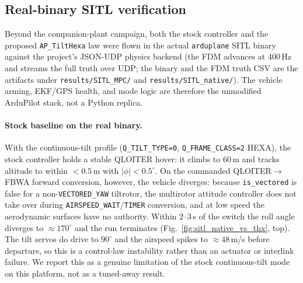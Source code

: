 \documentclass[preprint,3p,11pt]{elsarticle}
\begin{document}
\subsection{Real-binary SITL verification}\label{sec:realsitl}
Beyond the companion-plant campaign, both the stock controller and the
proposed \texttt{AP\_TiltHexa} law were flown in the actual
\texttt{arduplane} SITL binary against the project's JSON-UDP physics backend
(the FDM advances at 400\,Hz and streams the full truth over UDP; the binary
and the FDM truth CSV are the artifacts under \texttt{results/SITL\_MPC/} and
\texttt{results/SITL\_native/}). The vehicle arming, EKF/GPS health, and mode
logic are therefore the unmodified ArduPilot stack, not a Python replica.

\paragraph{Stock baseline on the real binary.}
With the continuous-tilt profile (\texttt{Q\_TILT\_TYPE=0},
\texttt{Q\_FRAME\_CLASS=2} HEXA), the stock controller holds a stable
QLOITER hover: it climbs to 60\,m and tracks altitude to within $<0.5$\,m
with $|\phi|<0.5^\circ$. On the commanded QLOITER$\to$FBWA forward
conversion, however, the vehicle diverges: because
\texttt{is\_vectored} is false for a non-\texttt{VECTORED\_YAW} tiltrotor,
the multirotor attitude controller does not take over during
\texttt{AIRSPEED\_WAIT}/\texttt{TIMER} conversion, and at low speed the
aerodynamic surfaces have no authority. Within $2$--$3$\,s of the switch the
roll angle diverges to $\approx 170^\circ$ and the run terminates (Fig.~\ref{fig:sitl_native_vs_thx}, top). The tilt servos do drive to
$90^\circ$ and the airspeed spikes to $\approx 48$\,m/s before departure, so
this is a control-law instability rather than an actuator or interlink
failure. We report this as a genuine limitation of the stock continuous-tilt
mode on this platform, not as a tuned-away result.
\end{document}
